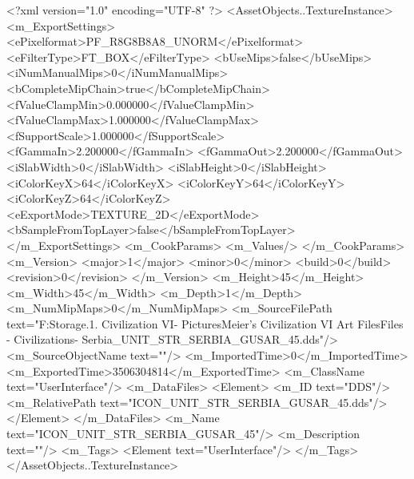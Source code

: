 <?xml version="1.0" encoding="UTF-8" ?>
<AssetObjects..TextureInstance>
	<m_ExportSettings>
		<ePixelformat>PF_R8G8B8A8_UNORM</ePixelformat>
		<eFilterType>FT_BOX</eFilterType>
		<bUseMips>false</bUseMips>
		<iNumManualMips>0</iNumManualMips>
		<bCompleteMipChain>true</bCompleteMipChain>
		<fValueClampMin>0.000000</fValueClampMin>
		<fValueClampMax>1.000000</fValueClampMax>
		<fSupportScale>1.000000</fSupportScale>
		<fGammaIn>2.200000</fGammaIn>
		<fGammaOut>2.200000</fGammaOut>
		<iSlabWidth>0</iSlabWidth>
		<iSlabHeight>0</iSlabHeight>
		<iColorKeyX>64</iColorKeyX>
		<iColorKeyY>64</iColorKeyY>
		<iColorKeyZ>64</iColorKeyZ>
		<eExportMode>TEXTURE_2D</eExportMode>
		<bSampleFromTopLayer>false</bSampleFromTopLayer>
	</m_ExportSettings>
	<m_CookParams>
		<m_Values/>
	</m_CookParams>
	<m_Version>
		<major>1</major>
		<minor>0</minor>
		<build>0</build>
		<revision>0</revision>
	</m_Version>
	<m_Height>45</m_Height>
	<m_Width>45</m_Width>
	<m_Depth>1</m_Depth>
	<m_NumMipMaps>0</m_NumMipMaps>
	<m_SourceFilePath text="F:\Mod Storage\2.1. Civilization VI\Mods\Archive - Pictures\Sid Meier's Civilization VI Art Files\Art Files - Civilizations\Civilization - Serbia\ICON_UNIT_STR_SERBIA_GUSAR_45.dds"/>
	<m_SourceObjectName text=""/>
	<m_ImportedTime>0</m_ImportedTime>
	<m_ExportedTime>3506304814</m_ExportedTime>
	<m_ClassName text="UserInterface"/>
	<m_DataFiles>
		<Element>
			<m_ID text="DDS"/>
			<m_RelativePath text="ICON_UNIT_STR_SERBIA_GUSAR_45.dds"/>
		</Element>
	</m_DataFiles>
	<m_Name text="ICON_UNIT_STR_SERBIA_GUSAR_45"/>
	<m_Description text=""/>
	<m_Tags>
		<Element text="UserInterface"/>
	</m_Tags>
</AssetObjects..TextureInstance>

